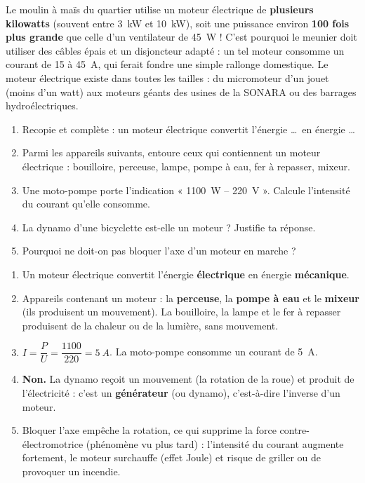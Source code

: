 \documentclass[11pt]{article}
\newcommand{\cle}[1]{{\popxbold\color{popdark}#1}}
\begin{document}
\begin{savaistu}
Le moulin à maïs du quartier utilise un moteur électrique de \textbf{plusieurs kilowatts} (souvent entre \SI{3}{kW} et \SI{10}{kW}), soit une puissance environ \textbf{100 fois plus grande} que celle d'un ventilateur de \SI{45}{W} ! C'est pourquoi le meunier doit utiliser des câbles épais et un disjoncteur adapté : un tel moteur consomme un courant de 15 à \SI{45}{A}, qui ferait fondre une simple rallonge domestique. Le moteur électrique existe dans toutes les tailles : du micromoteur d'un jouet (moins d'un watt) aux moteurs géants des usines de la SONARA ou des barrages hydroélectriques.
\end{savaistu}

\begin{exercice}
\begin{enumerate}
\item Recopie et complète : un moteur électrique convertit l'énergie \ldots\ en énergie \ldots
\item Parmi les appareils suivants, entoure ceux qui contiennent un moteur électrique : bouilloire, perceuse, lampe, pompe à eau, fer à repasser, mixeur.
\item Une moto-pompe porte l'indication « \SI{1100}{W} -- \SI{220}{V} ». Calcule l'intensité du courant qu'elle consomme.
\item La dynamo d'une bicyclette est-elle un moteur ? Justifie ta réponse.
\item Pourquoi ne doit-on pas bloquer l'axe d'un moteur en marche ?
\end{enumerate}
\end{exercice}

\begin{corrige}
\begin{enumerate}
\item Un moteur électrique convertit l'énergie \textbf{électrique} en énergie \textbf{mécanique}.
\item Appareils contenant un moteur : la \textbf{perceuse}, la \textbf{pompe à eau} et le \textbf{mixeur} (ils produisent un mouvement). La bouilloire, la lampe et le fer à repasser produisent de la chaleur ou de la lumière, sans mouvement.
\item $I = \dfrac{P}{U} = \dfrac{1100}{220} = \SI{5}{A}$. La moto-pompe consomme un courant de \SI{5}{A}.
\item \textbf{Non.} La dynamo reçoit un mouvement (la rotation de la roue) et produit de l'électricité : c'est un \textbf{générateur} (ou \cle{dynamo}), c'est-à-dire l'inverse d'un moteur.
\item Bloquer l'axe empêche la rotation, ce qui supprime la force contre-électromotrice (phénomène vu plus tard) : l'intensité du courant augmente fortement, le moteur surchauffe (effet Joule) et risque de griller ou de provoquer un incendie.
\end{enumerate}
\end{corrige}
\end{document}
